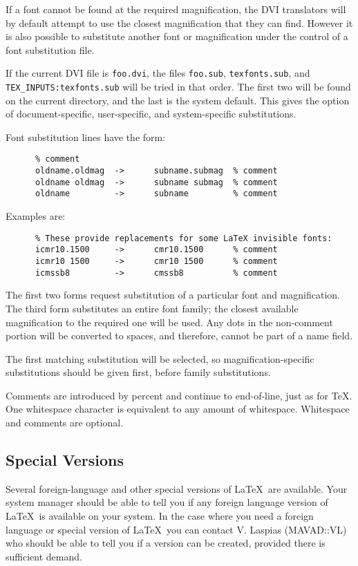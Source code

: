 If a font cannot be found at the required magnification, the DVI translators will by default
attempt to use the closest magnification that they can find.
However it is also possible to substitute another font or magnification under 
the control of a font substitution file. 

If the current DVI file is {\tt foo.dvi}, the files {\tt foo.sub},
{\tt texfonts.sub}, and {\tt TEX\_INPUTS:texfonts.sub} will be tried in that
order.
The first two will be found on the current directory, and the last is the
system default.
This gives the option of document-specific, user-specific, and system-specific
substitutions.

Font substitution lines have the form:
\begin{verbatim}
      % comment
      oldname.oldmag  ->      subname.submag  % comment
      oldname oldmag  ->      subname submag  % comment
      oldname         ->      subname         % comment
\end{verbatim}
Examples are:
\begin{verbatim}
      % These provide replacements for some LaTeX invisible fonts:
      icmr10.1500     ->      cmr10.1500      % comment
      icmr10 1500     ->      cmr10 1500      % comment
      icmssb8         ->      cmssb8          % comment
\end{verbatim}
The first two forms request substitution of a particular font and
magnification.
The third form substitutes an entire font family; the closest available
magnification to the required one will be used.
Any dots in the non-comment portion will be converted to spaces, and
therefore, cannot be part of a name field.

The first matching substitution will be selected, so magnification-specific
substitutions should be given first, before family substitutions.

Comments are introduced by percent and continue to end-of-line,
just as for \TeX. One whitespace character is equivalent to any amount of 
whitespace. Whitespace and comments are optional.
                                     

\subsection{Special Versions}
\label{se:special}

Several foreign-language and other special versions of \LaTeX\
are available. Your system manager should be able to 
tell you if any foreign language version of \LaTeX\ is available on 
your system. In the case where you need a foreign language or special version 
of \LaTeX\ you can contact V. Laspias (MAVAD::VL) who should be able to tell 
you if a version can be created, provided there is sufficient demand.

